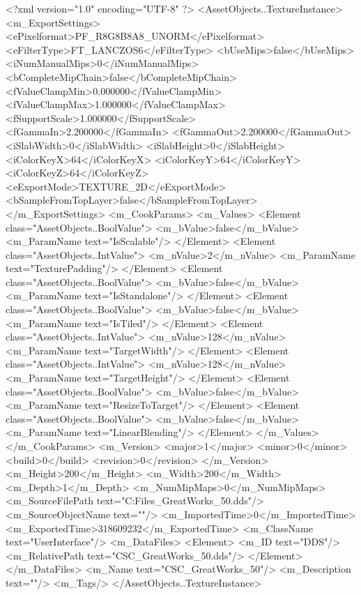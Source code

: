 <?xml version="1.0" encoding="UTF-8" ?>
<AssetObjects..TextureInstance>
	<m_ExportSettings>
		<ePixelformat>PF_R8G8B8A8_UNORM</ePixelformat>
		<eFilterType>FT_LANCZOS6</eFilterType>
		<bUseMips>false</bUseMips>
		<iNumManualMips>0</iNumManualMips>
		<bCompleteMipChain>false</bCompleteMipChain>
		<fValueClampMin>0.000000</fValueClampMin>
		<fValueClampMax>1.000000</fValueClampMax>
		<fSupportScale>1.000000</fSupportScale>
		<fGammaIn>2.200000</fGammaIn>
		<fGammaOut>2.200000</fGammaOut>
		<iSlabWidth>0</iSlabWidth>
		<iSlabHeight>0</iSlabHeight>
		<iColorKeyX>64</iColorKeyX>
		<iColorKeyY>64</iColorKeyY>
		<iColorKeyZ>64</iColorKeyZ>
		<eExportMode>TEXTURE_2D</eExportMode>
		<bSampleFromTopLayer>false</bSampleFromTopLayer>
	</m_ExportSettings>
	<m_CookParams>
		<m_Values>
			<Element class="AssetObjects..BoolValue">
				<m_bValue>false</m_bValue>
				<m_ParamName text="IsScalable"/>
			</Element>
			<Element class="AssetObjects..IntValue">
				<m_nValue>2</m_nValue>
				<m_ParamName text="TexturePadding"/>
			</Element>
			<Element class="AssetObjects..BoolValue">
				<m_bValue>false</m_bValue>
				<m_ParamName text="IsStandalone"/>
			</Element>
			<Element class="AssetObjects..BoolValue">
				<m_bValue>false</m_bValue>
				<m_ParamName text="IsTiled"/>
			</Element>
			<Element class="AssetObjects..IntValue">
				<m_nValue>128</m_nValue>
				<m_ParamName text="TargetWidth"/>
			</Element>
			<Element class="AssetObjects..IntValue">
				<m_nValue>128</m_nValue>
				<m_ParamName text="TargetHeight"/>
			</Element>
			<Element class="AssetObjects..BoolValue">
				<m_bValue>false</m_bValue>
				<m_ParamName text="ResizeToTarget"/>
			</Element>
			<Element class="AssetObjects..BoolValue">
				<m_bValue>false</m_bValue>
				<m_ParamName text="LinearBlending"/>
			</Element>
		</m_Values>
	</m_CookParams>
	<m_Version>
		<major>1</major>
		<minor>0</minor>
		<build>0</build>
		<revision>0</revision>
	</m_Version>
	<m_Height>200</m_Height>
	<m_Width>200</m_Width>
	<m_Depth>1</m_Depth>
	<m_NumMipMaps>0</m_NumMipMaps>
	<m_SourceFilePath text="C:\Users\Shadow\Desktop\Working Files\Icons\GreatWorks\CSC_GreatWorks_50.dds"/>
	<m_SourceObjectName text=""/>
	<m_ImportedTime>0</m_ImportedTime>
	<m_ExportedTime>318609232</m_ExportedTime>
	<m_ClassName text="UserInterface"/>
	<m_DataFiles>
		<Element>
			<m_ID text="DDS"/>
			<m_RelativePath text="CSC_GreatWorks_50.dds"/>
		</Element>
	</m_DataFiles>
	<m_Name text="CSC_GreatWorks_50"/>
	<m_Description text=""/>
	<m_Tags/>
</AssetObjects..TextureInstance>

